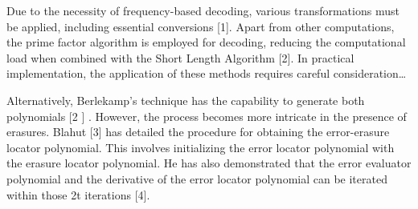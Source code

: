 Due to the necessity of frequency-based decoding, various transformations
must be applied, including essential conversions [1]. Apart from other computations,
the prime factor algorithm is employed for decoding, reducing the computational load
when combined with the Short Length Algorithm [2]. In practical implementation, the
application of these methods requires careful consideration\dots

Alternatively, Berlekamp's technique has the capability to generate both
polynomials [2 ] . However, the process becomes more intricate in the presence of
erasures. Blahut [3] has detailed the procedure for obtaining the error-erasure locator
polynomial. This involves initializing the error locator polynomial with the erasure
locator polynomial. He has also demonstrated that the error evaluator polynomial and the derivative of the error locator polynomial can be iterated within those 2t iterations
[4].
